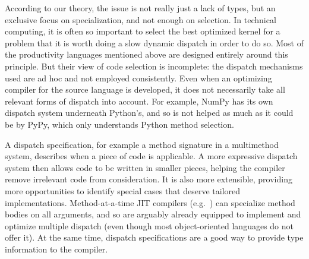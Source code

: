 According to our theory, the issue is not really just a lack of types,
but an exclusive focus on specialization, and not enough on selection.
In technical computing, it is often so important to select the best
optimized kernel for a problem that it is worth doing a slow dynamic
dispatch in order to do so.
Most of the productivity languages mentioned above are designed
entirely around this principle.
But their view of code selection is incomplete: the dispatch
mechanisms used are ad hoc and not employed consistently.
Even when an optimizing compiler for the source language is developed,
it does not necessarily take all relevant forms of dispatch into
account.
For example, NumPy has its own dispatch system underneath Python's,
and so is not helped as much as it could be by PyPy, which only
understands Python method selection.

A dispatch specification, for example a method signature in a
multimethod system, describes when a piece of code is applicable.
A more expressive dispatch system then allows code to be written
in smaller pieces, helping the compiler remove irrelevant code
from consideration.
It is also more extensible, providing more opportunities to
identify special cases that deserve tailored implementations.
Method-at-a-time JIT compilers
(e.g.\ \cite{grcevski2004java, Suganuma:2005:DED:1075382.1075386})
can specialize method bodies on all arguments, and so are
arguably already equipped to implement and optimize multiple dispatch
(even though most object-oriented languages do not offer it).
At the same time, dispatch specifications are a good way to provide
type information to the compiler.



